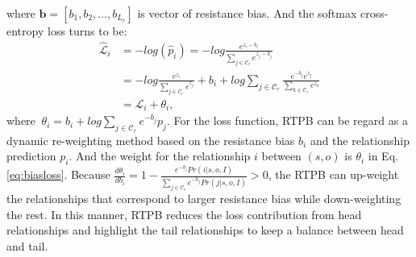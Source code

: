where $\mathbf{b}= [b_1,b_2,...,b_{L_r}]$ is vector of resistance bias.
And the softmax cross-entropy loss turns to be:
\begin{align}
    \mathcal{\hat{L}}_i 
	& = -log(\hat{p}_i)
		  = -log \frac{e^{z_{i} - b_{i}}}{\sum_{j\in \mathcal{C}_r}e^{z_{j} - b_{j}}}
    \nonumber\\
	& = -log \frac{e^{z_i}}{\sum_{j\in \mathcal{C}_r}e^{z_j}} + b_i + log \sum_{j\in\mathcal{C}_r}\frac{e^{-b_j}e^{z_j}}{\sum_{k\in \mathcal{C}_r}e^{z_k}} 
	\nonumber\\
	& = \mathcal{L}_i + \theta_{i}, 
	\label{eq:biasloss}	  
\end{align}
where $~ \theta_{i}  =  b_{i}  + log \sum_{j\in \mathcal{C}_r}e^{-b_{j}}p_j$.
For the loss function, RTPB can be regard as a dynamic re-weighting method based on the resistance bias $b_i$ and the relationship prediction $p_i$. And the weight for the relationship $i$ between $(s,o)$ is $\theta_i$ in Eq. \eqref{eq:biasloss}.
Because $\frac{d\theta_{i} }{d b_{i}} = 1 - \frac{e^{-b_{i}} Pr(i|s,o,I)}{\sum_{j\in \mathcal{C}_r}e^{-b_{j}} Pr(j|s,o,I)} > 0 $, the RTPB can up-weight the relationships that correspond to larger resistance bias while down-weighting the rest. In this manner, RTPB reduces the loss contribution from head relationships and highlight the tail relationships to keep a balance between head and tail. 
